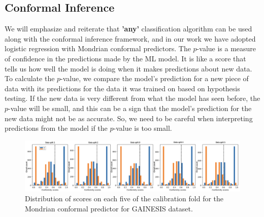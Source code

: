 \subsection*{Conformal Inference}
\label{Sec:ConformalInference} 
We will emphasize and reiterate that \textbf{'any'} classification algorithm can be used along with the conformal inference framework, and in our work we have adopted logistic regression with Mondrian conformal predictors. The $p$-value is a measure of confidence in the predictions made by the ML model. It is like a score that tells us how well the model is doing when it makes predictions about new data. To calculate the $p$-value, we compare the model's prediction for a new piece of data with its predictions for the data it was trained on based on hypothesis testing. If the new data is very different from what the model has seen before, the $p$-value will be small, and this can be a sign that the model's prediction for the new data might not be as accurate. So, we need to be careful when interpreting predictions from the model if the $p$-value is too small.

\begin{figure}[ht]
\centering
  \includegraphics[width=\linewidth]{figs/split.png}
  \caption{Distribution of scores on each five of the calibration fold for the Mondrian conformal predictor for GAINESIS dataset.}
  \label{fig:b_fold}
\end{figure}

